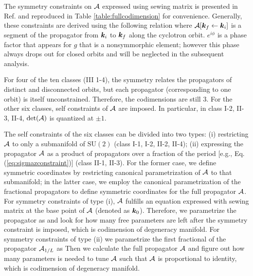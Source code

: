 \documentclass[aps, showpacs, twocolumn, notitlepage, superscriptaddress]{revtex4-1}
\begin{document}
The symmetry constraints on ${\cal A}$ expressed using sewing matrix is presented in Ref.  and reproduced in Table \ref{table:fullcodimension} for convenience. Generally, these constraints are derived using the following relation
where ${\cal A}[\boldsymbol{k}_f\leftarrow \boldsymbol{k}_i]$ is a segment of the propagator from $\boldsymbol{k}_i$ to $\boldsymbol{k}_f$ along the cyclotron orbit. $e^{i\phi}$ is a phase factor that appears for $g$ that is a nonsymmorphic element; however this phase always drops out\cite{100p} for closed orbits and will be neglected in the subsequent analysis.

For four of  the ten classes (III 1-4), the symmetry relates the propagators of distinct and disconnected orbits, but each propagator (corresponding to one orbit) is itself unconstrained.  Therefore, the codimensions are still 3. For the other six classes, self constraints of ${\cal A}$ are imposed. In particular, in class I-2, II-3, II-4, $\det({\cal A})$ is quantized at $\pm 1$\cite{topoferm,100p}.

The self constraints of the six classes can be divided into two types: (i) restricting ${\cal A}$ to only a submanifold of $\text{SU}(2)$ (class I-1, I-2, II-2, II-4); (ii) expressing the propagator ${\cal A}$ as a product of propagators over a fraction of the period [e.g., Eq. (\ref{eq:sigmazconstraint})] (class II-1, II-3). For the former case, we define symmetric coordinates by restricting canonical parametrization of ${\cal A}$ to that submanifold; in the latter case, we employ the canonical parametrization of the fractional propagators to define symmetric coordinates for the full propagator ${\cal A}$. For symmetry constraints of type (i), ${\cal A}$ fulfills an equation expressed with sewing matrix at the base point of ${\cal A}$ (denoted as $\boldsymbol{k}_0$). Therefore, we parametrize the propagator as
and look for how many free parameters are left after the symmetry constraint is imposed, which is codimension of degeneracy manifold. For symmetry constraints of type (ii) we parametrize the first fractional of the propagator ${\cal A}_{1/L}$ as
Then we calculate the full propagator ${\cal A}$ and figure out how many parameters is needed to tune ${\cal A}$ such that ${\cal A}$ is proportional to identity, which is codimension of degeneracy manifold.
\end{document}
